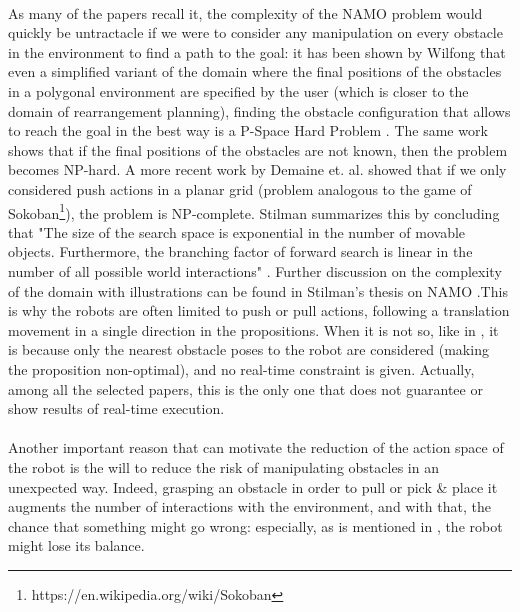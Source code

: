\paragraph{} As many of the papers \parencite{stilman_navigation_2005, stilman_planning_2007, stilman_planning_2008, wu_navigation_2010, levihn_planning_2013, levihn_locally_2014, scholz_navigation_2016} recall it, the complexity of the NAMO problem would quickly be untractacle if we were to consider any manipulation on every obstacle in the environment to find a path to the goal: it has been shown by Wilfong that even a simplified variant of the domain where the final positions of the obstacles in a polygonal environment are specified by the user (which is closer to the domain of rearrangement planning), finding the obstacle configuration that allows to reach the goal in the best way is a P-Space Hard Problem \parencite{wilfong_motion_1991}. The same work shows that if the final positions of the obstacles are not known, then the problem becomes NP-hard. A more recent work by Demaine et. al. showed that if we only considered push actions in a planar grid (problem analogous to the game of Sokoban\footnote{https://en.wikipedia.org/wiki/Sokoban}), the problem is NP-complete. Stilman summarizes this by concluding that "The size of the search space is exponential in the number of movable objects. Furthermore, the branching factor of forward search is linear in the number of all possible world interactions" \parencite{stilman_planning_2008}. Further discussion on the complexity of the domain with illustrations can be found in Stilman's thesis on NAMO \parencite{stilman_navigation_2007}.This is why the robots are often limited to push or pull actions, following a translation movement in a single direction in the propositions. When it is not so, like in \parencite{okada_environment_2004}, it is because only the nearest obstacle poses to the robot are considered (making the proposition non-optimal), and no real-time constraint is given. Actually, among all the selected papers, this is the only one that does not guarantee or show results of real-time execution.

\paragraph{} Another important reason that can motivate the reduction of the action space of the robot is the will to reduce the risk of manipulating obstacles in an unexpected way. Indeed, grasping an obstacle in order to pull or pick \& place it augments the number of interactions with the environment, and with that, the chance that something might go wrong: especially, as is mentioned in \parencite{stilman_planning_2007}, the robot might lose its balance.

